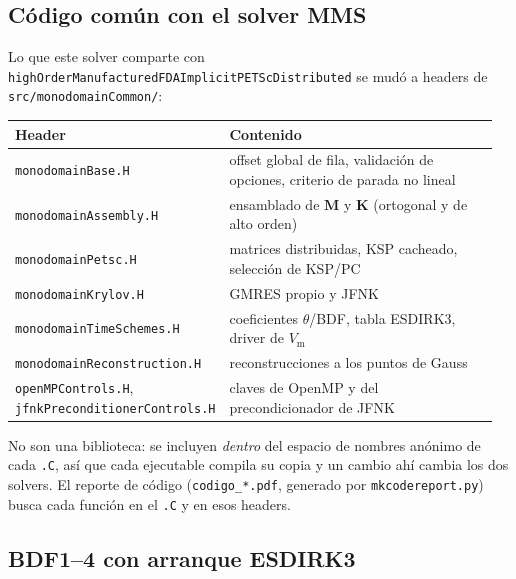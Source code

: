 \documentclass[11pt,a4paper]{article}
\newcommand{\code}[1]{\texttt{\small #1}}
\newcommand{\Vm}{V_{\text{m}}}
\newcommand{\Mmass}{\mathbf{M}}
\newcommand{\Kstif}{\mathbf{K}}
\begin{document}
\subsection{Código común con el solver MMS}

Lo que este solver comparte con \code{highOrderManufacturedFDAImplicitPETScDistributed}
se mudó a headers de \code{src/monodomainCommon/}:

\begin{center}
\begin{tabular}{@{}p{0.40\linewidth}p{0.56\linewidth}@{}}
\toprule
Header & Contenido \\
\midrule
\code{monodomainBase.H} & offset global de fila, validación de opciones, criterio de parada no lineal \\
\code{monodomainAssembly.H} & ensamblado de $\Mmass$ y $\Kstif$ (ortogonal y de alto orden) \\
\code{monodomainPetsc.H} & matrices distribuidas, KSP cacheado, selección de KSP/PC \\
\code{monodomainKrylov.H} & GMRES propio y JFNK \\
\code{monodomainTimeSchemes.H} & coeficientes $\theta$/BDF, tabla ESDIRK3, driver de $\Vm$ \\
\code{monodomainReconstruction.H} & reconstrucciones a los puntos de Gauss \\
\code{openMPControls.H}, \code{jfnkPreconditionerControls.H} & claves de OpenMP y del precondicionador de JFNK \\
\bottomrule
\end{tabular}
\end{center}

No son una biblioteca: se incluyen \emph{dentro} del espacio de nombres anónimo de
cada \code{.C}, así que cada ejecutable compila su copia y un cambio ahí cambia los
dos solvers. El reporte de código (\code{codigo\_*.pdf}, generado por
\code{mkcodereport.py}) busca cada función en el \code{.C} y en esos headers.

\subsection{BDF1--4 con arranque ESDIRK3}
\label{sec:oct-bdf}
\end{document}
